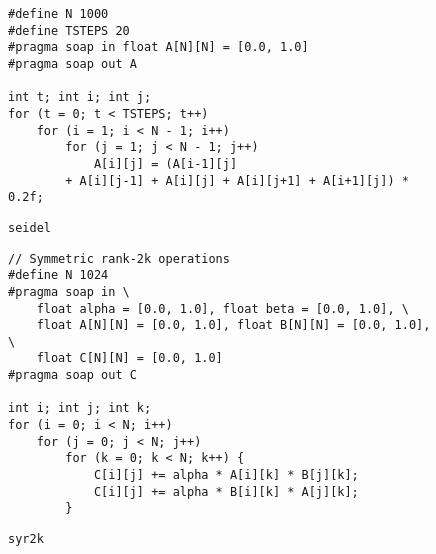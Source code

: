 \begin{figure}[ht]
\begin{lstlisting}
#define N 1000
#define TSTEPS 20
#pragma soap in float A[N][N] = [0.0, 1.0]
#pragma soap out A

int t; int i; int j;
for (t = 0; t < TSTEPS; t++)
    for (i = 1; i < N - 1; i++)
        for (j = 1; j < N - 1; j++)
            A[i][j] = (A[i-1][j]
        + A[i][j-1] + A[i][j] + A[i][j+1] + A[i+1][j]) * 0.2f;
\end{lstlisting}
\caption{\texttt{seidel}}
\end{figure}


\begin{figure}[ht]
\begin{lstlisting}
// Symmetric rank-2k operations
#define N 1024
#pragma soap in \
    float alpha = [0.0, 1.0], float beta = [0.0, 1.0], \
    float A[N][N] = [0.0, 1.0], float B[N][N] = [0.0, 1.0], \
    float C[N][N] = [0.0, 1.0]
#pragma soap out C

int i; int j; int k;
for (i = 0; i < N; i++)
    for (j = 0; j < N; j++)
        for (k = 0; k < N; k++) {
            C[i][j] += alpha * A[i][k] * B[j][k];
            C[i][j] += alpha * B[i][k] * A[j][k];
        }
\end{lstlisting}
\caption{\texttt{syr2k}}
\end{figure}
